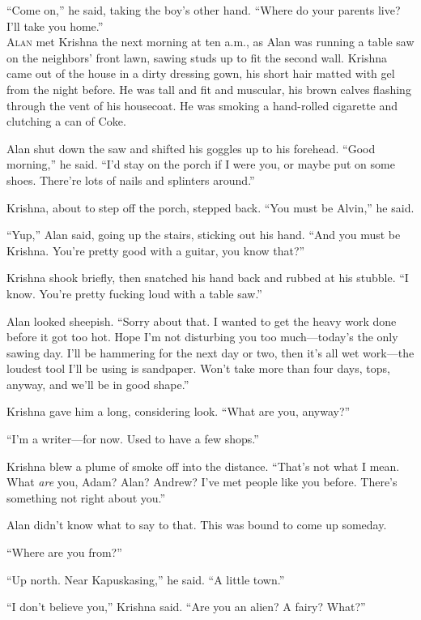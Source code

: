 ``Come on,'' he said, taking the boy's other hand.  ``Where do your
parents live?  I'll take you home.''
\\
\lettrine[lines=3, lhang=.5, nindent=0pt, findent=2pt]{A}{lan} met Krishna the next morning at ten a.m., as Alan was running a
table saw on the neighbors' front lawn, sawing studs up to fit the
second wall.  Krishna came out of the house in a dirty dressing gown,
his short hair matted with gel from the night before.  He was tall and
fit and muscular, his brown calves flashing through the vent of his
housecoat.  He was smoking a hand-rolled cigarette and clutching a can
of Coke.

Alan shut down the saw and shifted his goggles up to his forehead. 
``Good morning,'' he said.  ``I'd stay on the porch if I were you, or
maybe put on some shoes.  There're lots of nails and splinters
around.''

Krishna, about to step off the porch, stepped back.  ``You must be
Alvin,'' he said.

``Yup,'' Alan said, going up the stairs, sticking out his hand.  ``And
you must be Krishna.  You're pretty good with a guitar, you know
that?''

Krishna shook briefly, then snatched his hand back and rubbed at his
stubble.  ``I know.  You're pretty fucking loud with a table saw.''

Alan looked sheepish.  ``Sorry about that.  I wanted to get the heavy
work done before it got too hot.  Hope I'm not disturbing you too
much---today's the only sawing day.  I'll be hammering for the next
day or two, then it's all wet work---the loudest tool I'll be using is
sandpaper.  Won't take more than four days, tops, anyway, and we'll be
in good shape.''

Krishna gave him a long, considering look.  ``What are you, anyway?''

``I'm a writer---for now.  Used to have a few shops.''

Krishna blew a plume of smoke off into the distance.  ``That's not
what I mean.  What \textit{are} you, Adam?  Alan?  Andrew?  I've met
people like you before.  There's something not right about you.''

Alan didn't know what to say to that.  This was bound to come up
someday.

``Where are you from?''

``Up north.  Near Kapuskasing,'' he said.  ``A little town.''

``I don't believe you,'' Krishna said.  ``Are you an alien?  A fairy? 
What?''

